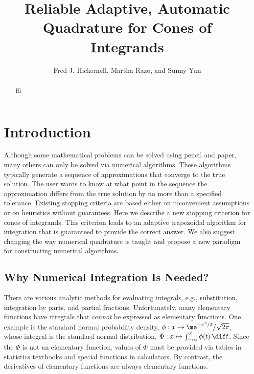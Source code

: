 \documentclass[]{article}
\theoremstyle{definition}
\theoremstyle{remark}
\begin{document}
\title{Reliable Adaptive, Automatic Quadrature for Cones of Integrands}
\author{Fred J. Hickernell, Martha Razo, and Sunny Yun}
\maketitle 


\begin{abstract} Hi
\end{abstract}


\section{Introduction} 

Although some mathematical problems can be solved using pencil and paper, many others can only be solved via numerical algorithms.  These algorithms typically generate a sequence of approximations that converge to the true solution.  The user wants to know at what point in the sequence the approximation differs from the true solution by no more than a specified tolerance. Existing stopping criteria are based either on inconvenient assumptions or on heuristics without guarantees.  Here we describe a new stopping criterion for cones of integrands.  This criterion leads to an adaptive trapezoidal algorithm for integration that is guaranteed to provide the correct answer.  We also suggest changing the way numerical quadrature is taught and propose a new paradigm for constructing numerical algorithms.

\subsection{Why Numerical Integration Is Needed?}
There are various analytic methods for evaluating integrals, e.g., substitution, integration by parts, and partial fractions.  Unfortunately, many elementary functions have integrals that \emph{cannot} be expressed as elementary functions.  One example is the standard normal probability density, $\phi: x \mapsto \me^{-x^2/2}/\sqrt{2 \pi}$, whose integral is the standard normal distribution, $\Phi : x \mapsto \int_{-\infty}^x \phi(t) \, \dif t$.  Since the $\Phi$ is not an elementary function, values of $\Phi$ must be provided via tables in statistics textbooks and special functions in calculators. By contrast, the derivatives of elementary functions are always elementary functions.  
\end{document}
